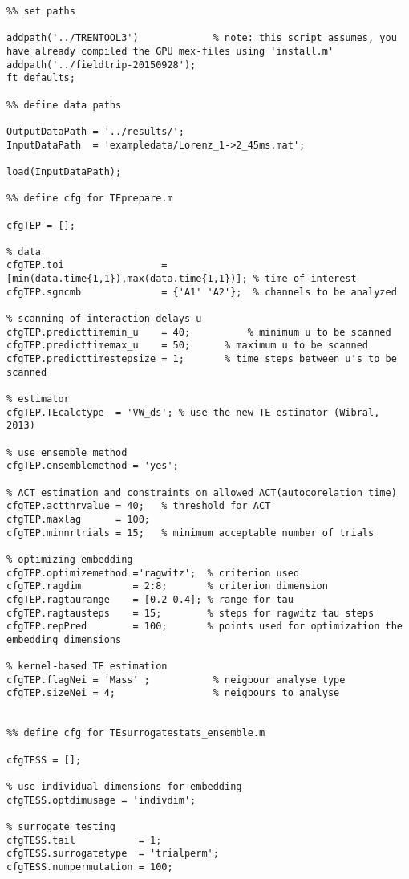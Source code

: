 \begin{lstlisting}
%% set paths

addpath('../TRENTOOL3')             % note: this script assumes, you have already compiled the GPU mex-files using 'install.m'
addpath('../fieldtrip-20150928');
ft_defaults;

%% define data paths

OutputDataPath = '../results/';
InputDataPath  = 'exampledata/Lorenz_1->2_45ms.mat';

load(InputDataPath);

%% define cfg for TEprepare.m

cfgTEP = [];

% data
cfgTEP.toi                 = [min(data.time{1,1}),max(data.time{1,1})]; % time of interest
cfgTEP.sgncmb              = {'A1' 'A2'};  % channels to be analyzed

% scanning of interaction delays u
cfgTEP.predicttimemin_u    = 40;		  % minimum u to be scanned
cfgTEP.predicttimemax_u    = 50;	  % maximum u to be scanned
cfgTEP.predicttimestepsize = 1; 	  % time steps between u's to be scanned

% estimator
cfgTEP.TEcalctype  = 'VW_ds'; % use the new TE estimator (Wibral, 2013)

% use ensemble method
cfgTEP.ensemblemethod = 'yes';

% ACT estimation and constraints on allowed ACT(autocorelation time)
cfgTEP.actthrvalue = 40;   % threshold for ACT
cfgTEP.maxlag      = 100;
cfgTEP.minnrtrials = 15;   % minimum acceptable number of trials

% optimizing embedding
cfgTEP.optimizemethod ='ragwitz';  % criterion used
cfgTEP.ragdim         = 2:8;       % criterion dimension
cfgTEP.ragtaurange    = [0.2 0.4]; % range for tau
cfgTEP.ragtausteps    = 15;        % steps for ragwitz tau steps
cfgTEP.repPred        = 100;       % points used for optimization the embedding dimensions

% kernel-based TE estimation
cfgTEP.flagNei = 'Mass' ;           % neigbour analyse type
cfgTEP.sizeNei = 4;                 % neigbours to analyse


%% define cfg for TEsurrogatestats_ensemble.m

cfgTESS = [];

% use individual dimensions for embedding
cfgTESS.optdimusage = 'indivdim';

% surrogate testing
cfgTESS.tail           = 1;
cfgTESS.surrogatetype  = 'trialperm';
cfgTESS.numpermutation = 100;


\end{lstlisting}
